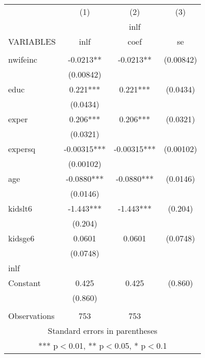 \begin{tabular}{lccc} \hline
 & (1) & (2) & (3) \\
 &  & inlf &  \\
VARIABLES & inlf & coef & se \\ \hline
 &  &  &  \\
nwifeinc & -0.0213** & -0.0213** & (0.00842) \\
 & (0.00842) &  &  \\
educ & 0.221*** & 0.221*** & (0.0434) \\
 & (0.0434) &  &  \\
exper & 0.206*** & 0.206*** & (0.0321) \\
 & (0.0321) &  &  \\
expersq & -0.00315*** & -0.00315*** & (0.00102) \\
 & (0.00102) &  &  \\
age & -0.0880*** & -0.0880*** & (0.0146) \\
 & (0.0146) &  &  \\
kidslt6 & -1.443*** & -1.443*** & (0.204) \\
 & (0.204) &  &  \\
kidsge6 & 0.0601 & 0.0601 & (0.0748) \\
 & (0.0748) &  &  \\
inlf &  &  &  \\
Constant & 0.425 & 0.425 & (0.860) \\
 & (0.860) &  &  \\
 &  &  &  \\
 Observations & 753 & 753 &  \\ \hline
\multicolumn{4}{c}{ Standard errors in parentheses} \\
\multicolumn{4}{c}{ *** p$<$0.01, ** p$<$0.05, * p$<$0.1} \\
\end{tabular}
